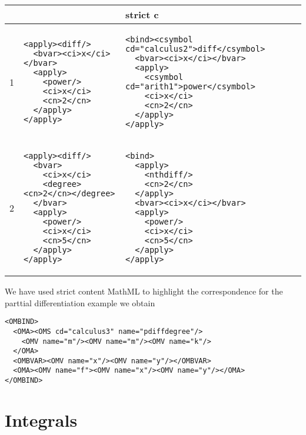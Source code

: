 \documentclass[12pt]{article}
\begin{document}
\begin{center}\lstset{frame=none,numbers=none,lineskip=-.7ex,aboveskip=-.5em,belowskip=-1em,language=MathML}
\begin{tabular}{|l|p{5.5cm}|p{8cm}|}\hline
 &  {\mathml2} & strict c{\mathml3}\\\hline
 1 &
\begin{lstlisting}
<apply><diff/>
  <bvar><ci>x</ci></bvar>
  <apply>
    <power/>
    <ci>x</ci>
    <cn>2</cn>
  </apply>
</apply>
\end{lstlisting}
&
\begin{lstlisting}
<bind><csymbol cd="calculus2">diff</csymbol>
  <bvar><ci>x</ci></bvar>
  <apply>
    <csymbol cd="arith1">power</csymbol>
    <ci>x</ci>
    <cn>2</cn>
  </apply>
</apply>
\end{lstlisting}
\\\hline
2 & 
\begin{lstlisting}[language=MathML]
<apply><diff/>
  <bvar>
    <ci>x</ci>
    <degree><cn>2</cn></degree>
  </bvar>
  <apply>
    <power/>
    <ci>x</ci>
    <cn>5</cn>
  </apply>
</apply>
\end{lstlisting}
&
\begin{lstlisting}[language=MathML]
<bind>
  <apply>
    <nthdiff/>
    <cn>2</cn>
  </apply>
  <bvar><ci>x</ci></bvar>
  <apply>
    <power/>
    <ci>x</ci>
    <cn>5</cn>
  </apply>
</apply>
\end{lstlisting}
\\\hline
\end{tabular}
\end{center}
We have used strict content MathML to highlight the correspondence for the parttial
differentiation example we obtain 
\begin{lstlisting}[language=OpenMath]
<OMBIND>
  <OMA><OMS cd="calculus3" name="pdiffdegree"/>
    <OMV name="m"/><OMV name="m"/><OMV name="k"/>
  </OMA>
  <OMBVAR><OMV name="x"/><OMV name="y"/></OMBVAR>
  <OMA><OMV name="f"><OMV name="x"/><OMV name="y"/></OMA>
</OMBIND>
\end{lstlisting}

\section{Integrals}
\end{document}
